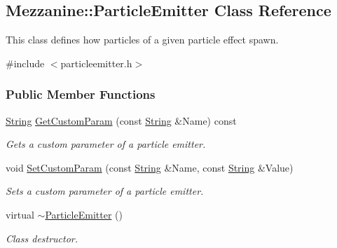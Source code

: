 \hypertarget{classMezzanine_1_1ParticleEmitter}{
\subsection{Mezzanine::ParticleEmitter Class Reference}
\label{classMezzanine_1_1ParticleEmitter}
}


This class defines how particles of a given particle effect spawn.  




{\ttfamily \#include $<$particleemitter.h$>$}

\subsubsection*{Public Member Functions}
\begin{DoxyCompactItemize}
\item 
\hyperlink{namespaceMezzanine_acf9fcc130e6ebf08e3d8491aebcf1c86}{String} \hyperlink{classMezzanine_1_1ParticleEmitter_a84747879e99f839d26ee2d7eefb3d44e}{GetCustomParam} (const \hyperlink{namespaceMezzanine_acf9fcc130e6ebf08e3d8491aebcf1c86}{String} \&Name) const 
\begin{DoxyCompactList}\small\item\em Gets a custom parameter of a particle emitter. \item\end{DoxyCompactList}\item 
void \hyperlink{classMezzanine_1_1ParticleEmitter_a7f29a1a044f72bd429f79e3f4cc10622}{SetCustomParam} (const \hyperlink{namespaceMezzanine_acf9fcc130e6ebf08e3d8491aebcf1c86}{String} \&Name, const \hyperlink{namespaceMezzanine_acf9fcc130e6ebf08e3d8491aebcf1c86}{String} \&Value)
\begin{DoxyCompactList}\small\item\em Sets a custom parameter of a particle emitter. \item\end{DoxyCompactList}\item 
\hypertarget{classMezzanine_1_1ParticleEmitter_a066a6652acdbc1cc9765b880d0f3a195}{
virtual \hyperlink{classMezzanine_1_1ParticleEmitter_a066a6652acdbc1cc9765b880d0f3a195}{$\sim$ParticleEmitter} ()}
\label{classMezzanine_1_1ParticleEmitter_a066a6652acdbc1cc9765b880d0f3a195}

\begin{DoxyCompactList}\small\item\em Class destructor. \item\end{DoxyCompactList}\end{DoxyCompactItemize}
